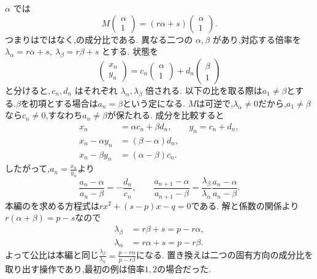  $\alpha$ では
\[
  M\begin{pmatrix}\alpha\\1\end{pmatrix}
  =(r\alpha+s)\begin{pmatrix}\alpha\\1\end{pmatrix}.
\]
つまりはではなく,の成分比である.
異なる二つの $\alpha,\beta$ があり,対応する倍率を
$\lambda_\alpha=r\alpha+s,\ \lambda_\beta=r\beta+s$ とする.
状態を
\[
  \begin{pmatrix}x_n\\y_n\end{pmatrix}
  =c_n\begin{pmatrix}\alpha\\1\end{pmatrix}
  +d_n\begin{pmatrix}\beta\\1\end{pmatrix}
\]
と分けると,$\,c_n,d_n$ はそれぞれ $\lambda_\alpha,\lambda_\beta$ 倍される.
以下の比を取る際は$a_1\ne\beta$とする.$\beta$を初項とする場合は$a_n=\beta$という定になる.
$M$は可逆で,$\lambda_\alpha\ne0$だから,$a_1\ne\beta$なら$c_n\ne0$,すなわち$a_n\ne\beta$が保たれる.
成分を比較すると
\[
  \begin{aligned}
    x_n&=\alpha c_n+\beta d_n,\qquad y_n=c_n+d_n,\\
    x_n-\alpha y_n&=(\beta-\alpha)d_n,\\
    x_n-\beta y_n&=(\alpha-\beta)c_n.
  \end{aligned}
\]
したがって,$\displaystyle a_n=\frac{x_n}{y_n}$より
\[
  \frac{a_n-\alpha}{a_n-\beta}=-\frac{d_n}{c_n},
  \qquad
  \frac{a_{n+1}-\alpha}{a_{n+1}-\beta}
  =\frac{\lambda_\beta}{\lambda_\alpha}
  \frac{a_n-\alpha}{a_n-\beta}.
\]
本編のを求める方程式は$rx^2+(s-p)x-q=0$である.
解と係数の関係より$r(\alpha+\beta)=p-s$なので
\[
  \begin{aligned}
    \lambda_\beta&=r\beta+s=p-r\alpha,\\
    \lambda_\alpha&=r\alpha+s=p-r\beta.
  \end{aligned}
\]
よって公比は本編と同じ$\displaystyle \frac{\lambda_\beta}{\lambda_\alpha}=\frac{p-r\alpha}{p-r\beta}$になる.
置き換えは二つの固有方向の成分比を取り出す操作であり,最初の例は倍率$1,2$の場合だった.

